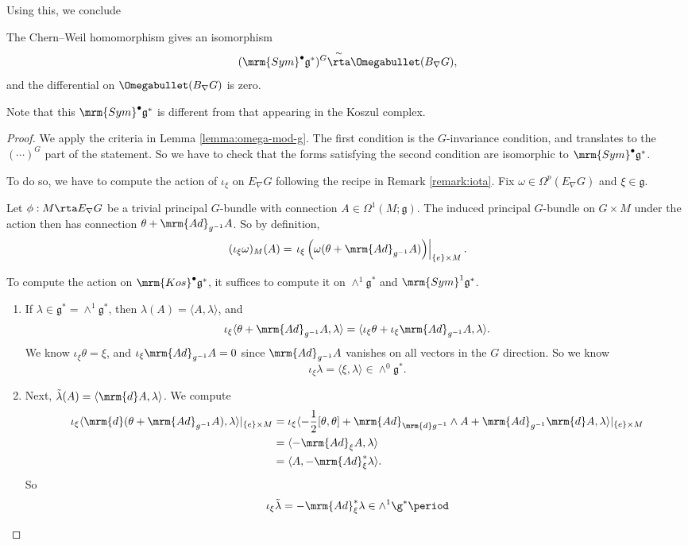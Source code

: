 Using this, we conclude
\begin{thm}
  The Chern--Weil homomorphism gives an isomorphism
  \[
    (\mrm{Sym}^\bullet \mathfrak{g}^*)^G \overset{\sim}{\rta} \Omegabullet(B_\nabla G),
  \]
  and the differential on $\Omegabullet(B_\nabla G)$ is zero.
\end{thm}
Note that this $\mrm{Sym}^\bullet \mathfrak{g}^*$ is different from that appearing in the Koszul complex.

\begin{proof}
  We apply the criteria in Lemma \ref{lemma:omega-mod-g}. The first condition is the $G$-invariance condition, and translates to the $(\cdots)^G$ part of the statement. So we have to check that the forms satisfying the second condition are isomorphic to $\mrm{Sym}^\bullet \mathfrak{g}^*$.

  To do so, we have to compute the action of $\iota_\xi$ on $E_\nabla G$ following the recipe in Remark \ref{remark:iota}. Fix $\omega \in \Omega^p(E_\nabla G)$ and $\xi \in \mathfrak{g}$.

  Let $\phi: M \rta E_\nabla G$ be a trivial principal $G$-bundle with connection $A \in \Omega^1(M; \mathfrak{g})$. The induced principal $G$-bundle on $G \times M$ under the action then has connection $\theta + \mrm{Ad}_{g^{-1}} A$. So by definition,
  \[
    (\iota_\xi \omega)_M(A) = \left.\iota_\xi \left(\omega(\theta + \mrm{Ad}_{g^{-1}} A)\right)\right|_{\{e\} \times M}.
  \]

  To compute the action on $\mrm{Kos}^\bullet \mathfrak{g}^*$, it suffices to compute it on $\wedge^1 \mathfrak{g}^*$ and $\mrm{Sym}^1 \mathfrak{g}^*$.

  \begin{enumerate}
    \item If $\lambda \in \mathfrak{g}^* = \wedge^1 \mathfrak{g}^*$, then $\lambda(A) = \langle A, \lambda\rangle$, and
      \[
        \iota_\xi \langle \theta + \mrm{Ad}_{g^{-1}} A, \lambda\rangle = \langle \iota_\xi \theta + \iota_\xi \mrm{Ad}_{g^{-1}} A, \lambda\rangle.
      \]
      We know $\iota_\xi \theta = \xi$, and $\iota_\xi \mrm{Ad}_{g^{-1}} A = 0$ since $\mrm{Ad}_{g^{-1}} A$ vanishes on all vectors in the $G$ direction. So we know
      \[
        \iota_\xi \lambda = \langle \xi, \lambda\rangle \in \wedge^0 \mathfrak{g}^*.
      \]

    \item Next, $\tilde{\lambda}(A) = \langle \mrm{d} A, \lambda \rangle$. We compute
 \begin{align*}
\iota_\xi\langle \mrm{d}(\theta+\mrm{Ad}_{g^{-1}}A),\lambda\rangle\vert_{\{e\}\times M}&=\iota_\xi\langle -\frac{1}{2}[\theta,\theta]+\mrm{Ad}_{\mrm{d}g^{-1}}\wedge A+\mrm{Ad}_{g^{-1}}\mrm{d}A,\lambda\rangle\vert_{\{e\}\times M}\\
&=\langle -\mrm{Ad}_\xi A,\lambda\rangle\\
&=\langle A,-\mrm{Ad}_\xi^*\lambda\rangle.
\end{align*}
      So
      \[\iota_\xi \tilde{\lambda} = -\mrm{Ad}^*_\xi \lambda \in \wedge^1 \g^*\period\]
  \end{enumerate}


\end{proof}
